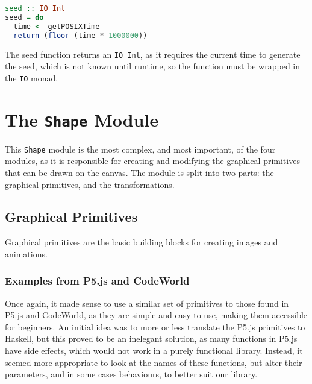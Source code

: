 \documentclass[../main.tex]{subfiles}
\begin{document}
            \begin{lstlisting}[language={Haskell}, label={lst:seed}, caption={The \texttt{seed} function.}]
seed :: IO Int
seed = do
  time <- getPOSIXTime
  return (floor (time * 1000000))\end{lstlisting}

            The seed function returns an \texttt{IO Int}, as it requires the current time
                to generate the seed, which is not known until runtime, so the function must be
                wrapped in the \texttt{IO} monad.

    \section{The \texttt{Shape}
        Module} This \texttt{Shape} module is the most complex, and most important, of
            the four modules, as it is responsible for creating and modifying the graphical
            primitives that can be drawn on the canvas.
        The module is split into two parts: the graphical primitives, and the
            transformations.

        \subsection{Graphical Primitives}
            Graphical primitives are the basic building blocks for creating images and
                animations.

            \subsubsection{Examples from P5.js and CodeWorld}
                Once again, it made sense to use a similar set of primitives to those found in
                    P5.js and CodeWorld, as they are simple and easy to use, making them accessible
                    for beginners.
                An initial idea was to more or less translate the P5.js primitives to Haskell,
                    but this proved to be an inelegant solution, as many functions in P5.js have
                    side effects, which would not work in a purely functional library.
                Instead, it seemed more appropriate to look at the names of these functions,
                    but alter their parameters, and in some cases behaviours, to better suit our
                    library.
\end{document}
